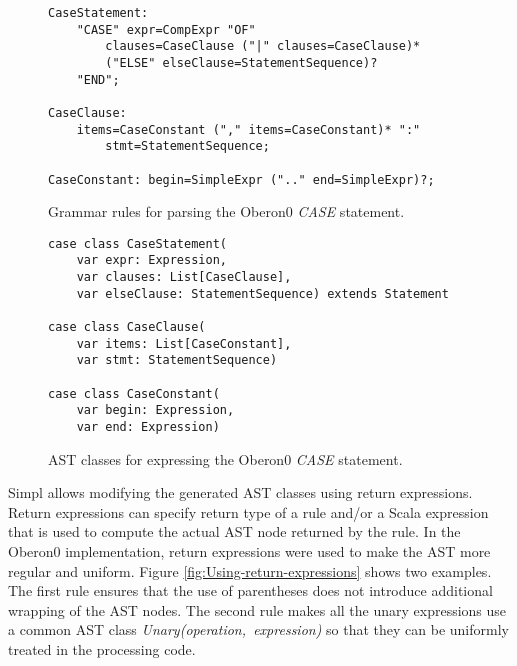 %
\begin{figure}[!h]
{\small }
\begin{lstlisting}[basicstyle={\footnotesize\ttfamily}]
CaseStatement:
    "CASE" expr=CompExpr "OF"
        clauses=CaseClause ("|" clauses=CaseClause)*
        ("ELSE" elseClause=StatementSequence)?
    "END";

CaseClause:
    items=CaseConstant ("," items=CaseConstant)* ":"
        stmt=StatementSequence;

CaseConstant: begin=SimpleExpr (".." end=SimpleExpr)?;
\end{lstlisting}
{\small \par}

\caption{\label{fig:case-statement}Grammar rules for parsing the Oberon0 \emph{CASE}
statement.}

\end{figure}


%
\begin{figure}[!h]
{\small }
\begin{lstlisting}[basicstyle={\footnotesize\ttfamily}]
case class CaseStatement(
    var expr: Expression, 
    var clauses: List[CaseClause], 
    var elseClause: StatementSequence) extends Statement

case class CaseClause(
    var items: List[CaseConstant],
    var stmt: StatementSequence)

case class CaseConstant(
    var begin: Expression, 
    var end: Expression)
\end{lstlisting}
{\small \par}

\caption{\label{fig:Automatically-generated-AST}AST classes for expressing
the Oberon0 \emph{CASE }statement.}

\end{figure}


Simpl allows modifying the generated AST classes using return expressions.
Return expressions can specify return type of a rule and/or a Scala
expression that is used to compute the actual AST node returned by
the rule. In the Oberon0 implementation, return expressions were used
to make the AST more regular and uniform. Figure \ref{fig:Using-return-expressions}
shows two examples. The first rule ensures that the use of parentheses
does not introduce additional wrapping of the AST nodes. The second
rule makes all the unary expressions use a common AST class \emph{Unary(operation,~expression)}
so that they can be uniformly treated in the processing code. 

